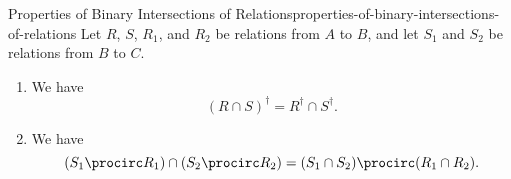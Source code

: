 \begin{proposition}{Properties of Binary Intersections of Relations}{properties-of-binary-intersections-of-relations}%
    Let $R$, $S$, $R_{1}$, and $R_{2}$ be relations from $A$ to $B$, and let $S_{1}$ and $S_{2}$ be relations from $B$ to $C$.
    \begin{enumerate}
        \item\label{properties-of-binary-intersections-of-relations-interaction-with-converses}We have
            \[
                (R\cap S)^{\dagger}
                =
                R^{\dagger}\cap S^{\dagger}.
            \]%
        \item\label{properties-of-binary-intersections-of-relations-interaction-with-composition}We have
            \[
                (S_{1}\procirc R_{1})
                \cap
                (S_{2}\procirc R_{2})
                =
                (S_{1}\cap S_{2})
                \procirc
                (R_{1}\cap R_{2}).
            \]%
    \end{enumerate}
\end{proposition}
